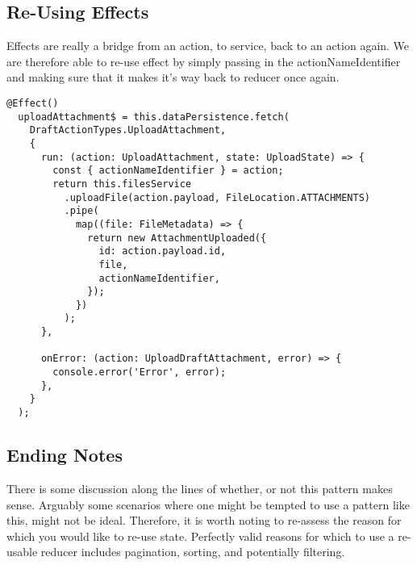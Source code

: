 \subsection{Re-Using Effects}
Effects are really a bridge from an action, to service, back to an action again.
We are therefore able to re-use effect by simply passing in the
actionNameIdentifier and making sure that it makes it's way back to reducer
once again.
\begin{lstlisting}
@Effect()
  uploadAttachment$ = this.dataPersistence.fetch(
    DraftActionTypes.UploadAttachment,
    {
      run: (action: UploadAttachment, state: UploadState) => {
        const { actionNameIdentifier } = action;
        return this.filesService
          .uploadFile(action.payload, FileLocation.ATTACHMENTS)
          .pipe(
            map((file: FileMetadata) => {
              return new AttachmentUploaded({
                id: action.payload.id,
                file,
                actionNameIdentifier,
              });
            })
          );
      },

      onError: (action: UploadDraftAttachment, error) => {
        console.error('Error', error);
      },
    }
  );
\end{lstlisting}

\subsection{ Ending Notes }
There is some discussion along the lines of whether, or not this pattern makes
sense. Arguably some scenarios where one might be tempted to use a pattern like
this, might not be ideal. Therefore, it is worth noting to re-assess the reason
for which you would like to re-use state. Perfectly valid reasons for which to
use a re-usable reducer includes pagination, sorting, and potentially filtering. 
